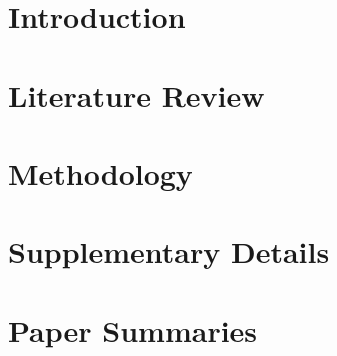\documentclass[]{book}
\begin{document}


\tableofcontents


\chapter{Introduction}






\chapter{Literature Review}



\chapter{Methodology}




\appendix
{}


\chapter{Supplementary Details}


\chapter{Paper Summaries}

\newpage

\newpage

\newpage

\newpage

\newpage

\newpage

\newpage

\newpage

\newpage


\newpage
\thispagestyle{empty}
\listoffigures
\listoftables


\newpage


\end{document}
